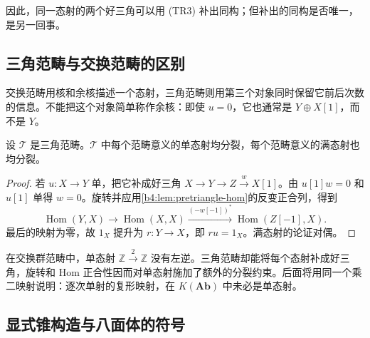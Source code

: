 因此，同一态射的两个好三角可以用 (TR3) 补出同构；但补出的同构是否唯一，是另一回事。

\subsection{三角范畴与交换范畴的区别}
\label{b4:subsec:1602:03}

交换范畴用核和余核描述一个态射，三角范畴则用第三个对象同时保留它前后次数的信息。不能把这个对象简单称作余核：即使 \(u=0\)，它也通常是 \(Y\oplus X[1]\)，而不是 \(Y\)。

\begin{proposition}\label{b4:prop:triangle-mono-splits}
	设 \(\mathcal T\) 是三角范畴。\(\mathcal T\) 中每个范畴意义的单态射均分裂，每个范畴意义的满态射也均分裂。
\end{proposition}
\begin{proof}
	若 \(u:X\to Y\) 单，把它补成好三角 \(X\to Y\to Z\xrightarrow{w}X[1]\)。由 \(u[1]w=0\) 和 \(u[1]\) 单得 \(w=0\)。旋转并应用\cref{b4:lem:pretriangle-hom}的反变正合列，得到
	\[
		\operatorname{Hom}(Y,X)\longrightarrow\operatorname{Hom}(X,X) \xrightarrow{(-w[-1])^*}\operatorname{Hom}(Z[-1],X).
	\]
	最后的映射为零，故 \(1_X\) 提升为 \(r:Y\to X\)，即 \(ru=1_X\)。满态射的论证对偶。
\end{proof}

在交换群范畴中，单态射 \(\mathbb Z\xrightarrow{2}\mathbb Z\) 没有左逆。三角范畴却能将每个态射补成好三角，旋转和 Hom 正合性因而对单态射施加了额外的分裂约束。后面将用同一个乘二映射说明：逐次单射的复形映射，在 \(K(\mathbf{Ab})\) 中未必是单态射。

\subsection{显式锥构造与八面体的符号}
\label{b4:subsec:1602:04}

